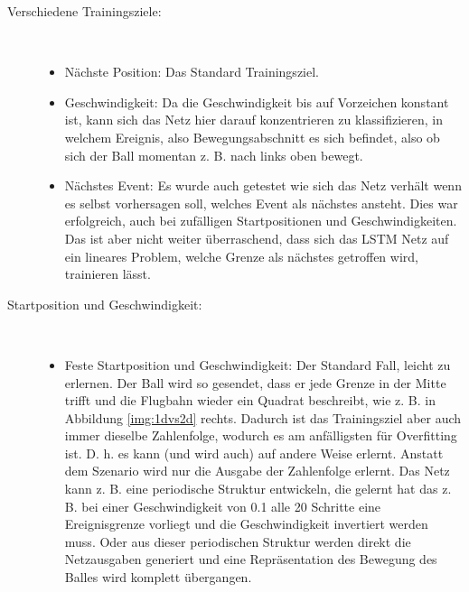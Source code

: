 \begin{description}
	\item[Verschiedene Trainingsziele:] \hfill \\
	\begin{itemize}
	
	\item Nächste Position: Das Standard Trainingsziel.
	\item Geschwindigkeit: Da die Geschwindigkeit bis auf Vorzeichen konstant ist, kann sich das Netz hier darauf konzentrieren zu klassifizieren, in welchem Ereignis, also Bewegungsabschnitt es sich befindet, also ob sich der Ball momentan z. B. nach links oben bewegt.  
	\item Nächstes Event: Es wurde auch getestet wie sich das Netz verhält wenn es selbst vorhersagen soll, welches Event als nächstes ansteht. Dies war erfolgreich, auch bei zufälligen Startpositionen und Geschwindigkeiten. Das ist aber nicht weiter überraschend, dass sich das LSTM Netz auf ein lineares Problem, welche Grenze als nächstes getroffen wird, trainieren lässt. 
	
\end{itemize}
	\item[Startposition und Geschwindigkeit:]\hfill \\
	\begin{itemize}
		\item Feste Startposition und Geschwindigkeit: Der Standard Fall, leicht zu erlernen. Der Ball wird so gesendet, dass er jede Grenze in der Mitte trifft und die Flugbahn wieder ein Quadrat beschreibt, wie z. B. in Abbildung \ref{img:1dvs2d} rechts. Dadurch ist das Trainingsziel aber auch immer dieselbe Zahlenfolge, wodurch es am anfälligsten für Overfitting ist. D. h. es kann (und wird auch) auf andere Weise erlernt. Anstatt dem Szenario wird nur die Ausgabe der Zahlenfolge erlernt. Das Netz kann z. B. eine periodische Struktur entwickeln, die gelernt hat das z. B. bei einer Geschwindigkeit von 0.1 alle 20 Schritte eine Ereignisgrenze vorliegt und die Geschwindigkeit invertiert werden muss. Oder aus dieser periodischen Struktur werden direkt die Netzausgaben generiert und eine Repräsentation des Bewegung des Balles wird komplett übergangen. 
		

\end{itemize}
\end{description}
